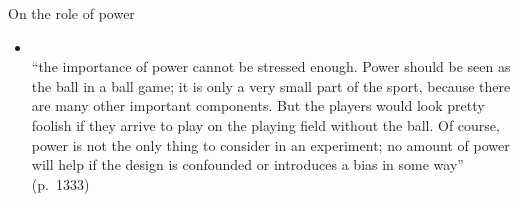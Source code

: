 \documentclass[aspectratio=169]{beamer}
\begin{document}
\begin{frame}{On the role of power}

\begin{itemize}
\item \citet{VasishthGelman21}\\[1ex]

``the importance of power cannot be stressed enough. Power should be seen as
the ball in a ball game; it is only a very small part of the sport, because
there are many other important components. But the players would look pretty
foolish if they arrive to play on the playing field without the ball. Of
course, power is not the only thing to consider in an experiment; no amount of
power will help if the design is confounded or introduces a bias in some
way'' (p.~1333)
\end{itemize}

\end{frame}
\end{document}
